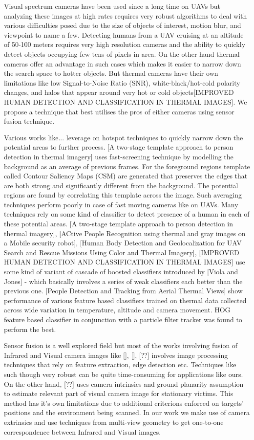 \documentclass[runningheads]{llncs}
\begin{document}
Visual spectrum cameras have been used since a long time on UAVs but analyzing these images at high rates requires very robust algorithms to deal with various difficulties posed due to the size of objects of interest, motion blur, and viewpoint to name a few. Detecting humans from a UAV cruising at an altitude of 50-100 meters requires very high resolution cameras and the ability to quickly detect objects occupying few tens of pixels in area. On the other hand thermal cameras offer an advantage in such cases which makes it easier to narrow down the search space to hotter objects. But thermal cameras have their own limitations like low Signal-to-Noise Ratio (SNR), white-black/hot-cold polarity changes, and halos that appear around very hot or cold objects[IMPROVED HUMAN DETECTION AND CLASSIFICATION IN THERMAL IMAGES]. We propose a technique that best utilises the pros of either cameras using sensor fusion technique.

Various works like... leverage on hotspot techniques to quickly narrow down the potential areas to further process. [A two-stage template approach to person detection in thermal imagery] uses fast-screening technique by modelling the background as an average of previous frames. For the foreground regions template called Contour Saliency Maps (CSM) are generated that preserves the edges that are both strong and significantly different from the background. The potential regions are found by correlating this template across the image. Such averaging techniques perform poorly in case of fast moving cameras like on UAVs. Many techniques rely on some kind of classifier to detect presence of a human in each of these potential areas. [A two-stage template approach to person detection in thermal imagery], [ACtive People Recognition using thermal and gray images on a Mobile security robot], [Human Body Detection and Geolocalization for UAV Search and Rescue Missions Using Color and Thermal Imagery], [IMPROVED HUMAN DETECTION AND CLASSIFICATION IN THERMAL IMAGES] use some kind of variant of cascade of boosted classifiers introduced by [Viola and Jones] - which basically involves a series of weak classifiers each better than the previous one. [People Detection and Tracking from Aerial Thermal Views] show performance of various feature based classifiers trained on thermal data collected across wide variation in temperature, altitude and camera movement. HOG feature based classifier in conjunction with a particle filter tracker was found to perform the best.

Sensor fusion is a well explored field but most of the works involving fusion of Infrared and Visual camera images like [], [], [??] involves image processing techniques that rely on feature extraction, edge detection etc. Techniques like such though very robust can be quite time-consuming for applications like ours. On the other hand, [??] uses camera intrinsics and ground planarity assumption to estimate relevant part of visual camera image for stationary victims. This method has it's own limitations due to additional criterions enforced on targets' positions and the environment being scanned. In our work we make use of camera extrinsics and use techniques from multi-view geometry to get one-to-one correspondence between Infrared and Visual images.
\end{document}
